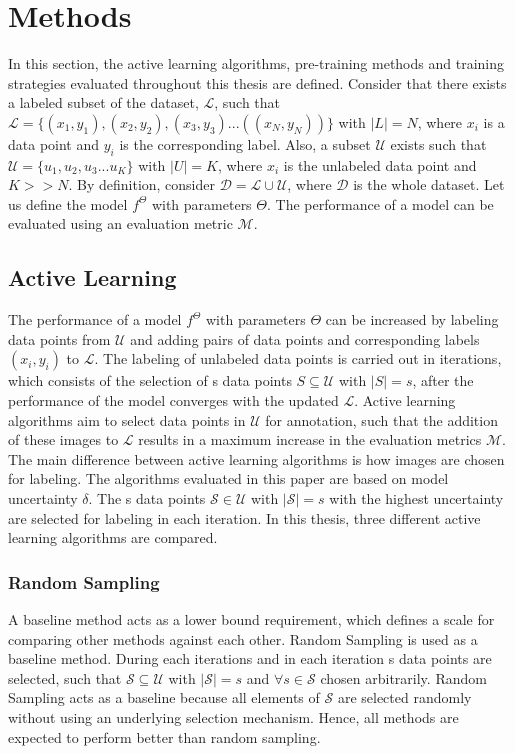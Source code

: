 
\chapter{Methods}\label{chapter:methods}
In this section, the active learning algorithms, pre-training methods and training strategies evaluated throughout this thesis are defined. Consider that there exists a labeled subset of the dataset, $\mathcal{L}$, such that $\mathcal{L} = \{(x_1, y_1), (x_2, y_2), (x_3, y_3) ... ((x_N, y_N))\}$ with $|L| = N$, where $x_i$ is a data point and $y_i$ is the corresponding label. Also, a subset $\mathcal{U}$ exists such that $\mathcal{U} = \{u_1, u_2, u_3 ... u_K\}$ with $|U| = K$, where $x_i$ is the unlabeled data point and $K>>N$. By definition, consider $\mathcal{D} = \mathcal{L} \cup \mathcal{U}$, where $\mathcal{D}$ is the whole dataset. Let us define the model $f^\Theta$ with parameters $\Theta$. The performance of a model can be evaluated using an evaluation metric $\mathcal{M}$.

\section{Active Learning}\label{section:active_learning}
The performance of a model $f^\Theta$ with parameters $\Theta$ can be increased by labeling data points from $\mathcal{U}$ and adding pairs of data points and corresponding labels $(x_i, y_i)$ to $\mathcal{L}$. The labeling of unlabeled data points is carried out in iterations, which consists of the selection of s data points $S \subseteq \mathcal{U}$ with $|S| = s$, after the performance of the model converges with the updated $\mathcal{L}$. Active learning algorithms aim to select data points in $\mathcal{U}$ for annotation, such that the addition of these images to $\mathcal{L}$ results in a maximum increase in the evaluation metrics $\mathcal{M}$. The main difference between active learning algorithms is how images are chosen for labeling. The algorithms evaluated in this paper are based on model uncertainty $\delta$. The s data points $\mathcal{S} \in \mathcal{U}$ with $|\mathcal{S}| = s$ with the highest uncertainty are selected for labeling in each iteration. In this thesis, three different active learning algorithms are compared.

\subsection{Random Sampling}
A baseline method acts as a lower bound requirement, which defines a scale for comparing other methods against each other. Random Sampling is used as a baseline method. During each iterations and in each iteration s data points are selected, such that $\mathcal{S} \subseteq \mathcal{U}$ with $|\mathcal{S}| = s$ and $\forall s \in \mathcal{S}$ chosen arbitrarily. Random Sampling acts as a baseline because all elements of $\mathcal{S}$ are selected randomly without using an underlying selection mechanism. Hence, all methods are expected to perform better than random sampling.

